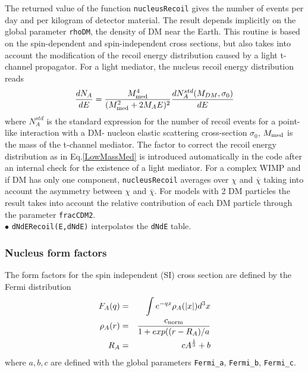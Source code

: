 \documentclass[12pt,a4paper]{article}
\begin{document}
The returned value of the function {\tt nucleusRecoil} gives the number of events per day and per kilogram of 
detector material. The  result depends  implicitly on the  global  parameter \verb|rhoDM|, the
density of DM near the Earth.
This routine is  based on the spin-dependent and spin-independent cross sections, but also
takes into account the modification of the recoil energy distribution caused  by a  light t- channel propagator.
For a light mediator, the nucleus recoil energy distribution  reads
\begin{equation}
\label{LowMassMed}
\frac{dN_{A}}{dE} = \frac{ M_{\rm med}^4}{(M_{\rm med}^2 +2 M_{A} E)^2}
\frac{dN_{A}^{std}(M_{DM},\sigma_0)}{dE} 
\end{equation}
where $N_{A}^{std}$ is the standard expression for the number of recoil events for a point-like interaction with a DM- nucleon elastic scattering cross-section $\sigma_0$, $M_{\rm med}$ is the mass of the t-channel mediator. The factor to correct the  recoil energy distribution as in Eq.\ref{LowMassMed}  is introduced automatically in the code after an internal check for  the existence of a light
mediator. For a complex WIMP and if DM has only one
component, \verb|nucleusRecoil| averages over $\chi$ and
$\overline{\chi}$ taking into account  the asymmetry between $\chi$ and $\overline{\chi}$. For models with 2 DM particles  the result takes into  account the relative contribution of each DM particle through the
parameter {\tt fracCDM2}.\\



\noindent $\bullet$ \verb|dNdERecoil(E,dNdE)| interpolates the {\tt dNdE} table.

\subsubsection{Nucleus form factors}
\label{Nucleus_form_factors}
The form factors for the spin independent (SI) cross section are defined by the Fermi distribution
\begin{eqnarray}
F_A(q)&=&\int e^{-qx}\rho_A(|x|)d^3x\\
\rho_A(r)&=&\frac{c_{\rm{norm}}}{ 1+ exp((r-R_A)/a}\\
R_A&=& c A^{\frac{1}{3}} +b
\end{eqnarray}
where $a,b,c$ are defined with  the global parameters \verb|Fermi_a|, \verb|Fermi_b|,
\verb|Fermi_c|. 
\end{document}
